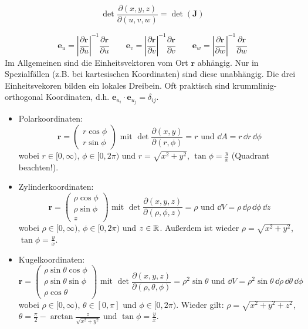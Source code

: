 \begin{frameddefn}[Funktionaldeterminante]
\[	
\det \frac{\partial (x,y,z)}{\partial (u,v,w)} = \det(\mathbf{J})
\]
\end{frameddefn}

\begin{framedprop}
\[
\mathbf{e}_u = \left| \frac{\partial \mathbf{r}}{\partial u} \right|^{-1} \frac{\partial \mathbf{r}}{\partial u} \qquad
 \mathbf{e}_v = \left| \frac{\partial \mathbf{r}}{\partial v} \right|^{-1} \frac{\partial \mathbf{r}}{\partial v} \qquad
 \mathbf{e}_w = \left| \frac{\partial \mathbf{r}}{\partial w} \right|^{-1} \frac{\partial \mathbf{r}}{\partial w}
\]
Im Allgemeinen sind die Einheitsvektoren vom Ort $\mathbf{r}$ abhängig. Nur in Spezialfällen (z.B. bei kartesischen Koordinaten) sind diese unabhängig. Die drei Einheitsvekoren bilden ein lokales Dreibein. Oft praktisch sind krummlinig-orthogonal Koordinaten, d.h. $\mathbf{e}_{u_{i}} \cdot \mathbf{e}_{u_{j}} = \delta_{ij}$.
\end{framedprop}

\begin{framedprop}
	\begin{itemize}
		\item Polarkoordinaten:
		\[
		\mathbf{r} = \left(\begin{array}{c} r \cos\phi \\ r \sin\phi \end{array} \right) \textrm{ mit } \det \frac{\partial (x,y)}{\partial (r, \phi)} = r \textrm{ und } \dd A = r \, \dd r \, \dd \phi
		\]
		wobei $r \in [0, \infty)$, $\phi \in [0,2\pi)$ und $r = \sqrt{x^2 + y^2}$, $\tan\phi = \frac{y}{x}$ (Quadrant beachten!).
		\item Zylinderkoordinaten:
		\[
		\mathbf{r} = \left(\begin{array}{c} \rho \cos\phi \\ \rho \sin\phi \\ z \end{array} \right) \textrm{ mit } \det \frac{\partial (x,y,z)}{\partial (\rho, \phi, z)} = \rho \textrm{ und } \dd V = \rho \, \dd \rho \, \dd \phi \, \dd z
		\]
		wobei $\rho \in [0, \infty)$, $\phi \in [0,2\pi)$ und $z \in \mathbb{R}$. Außerdem ist wieder $\rho = \sqrt{x^2 + y^2}$, $\tan\phi = \frac{y}{x}$.
		\item Kugelkoordinaten:
		\[
		\mathbf{r} = \left(\begin{array}{c} \rho \sin\theta \cos\phi \\ \rho \sin\theta \sin\phi \\ \rho \cos\theta \end{array} \right) \textrm{ mit } \det \frac{\partial (x,y,z)}{\partial (\rho, \theta, \phi)} = \rho^2 \sin\theta \textrm{ und } \dd V = \rho^2 \sin\theta \, \dd \rho \, \dd \theta \, \dd \phi
		\]
		wobei $\rho \in [0, \infty)$, $\theta \in [0,\pi]$ und $\phi \in [0,2\pi)$. Wieder gilt: $\rho = \sqrt{x^2+y^2+z^2}$, $\theta = \frac{\pi}{2} - \arctan\frac{z}{\sqrt{x^2+y^2}}$ und $\tan\phi = \frac{y}{x}$.
	\end{itemize}
\end{framedprop}

